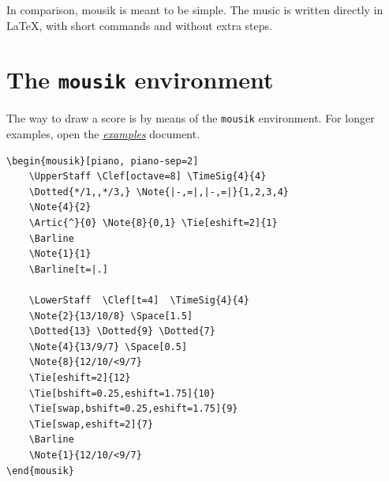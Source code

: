\documentclass[final]{article}
\begin{document}
    In comparison, \textsf{mousik} is meant to be simple. The music is written directly in \LaTeX{}, with short commands and without extra steps.

    \section{The \texttt{mousik} environment}
	The way to draw a score is by means of the \texttt{mousik} environment. For longer examples, open the \href{run:examples.pdf}{\textit{examples}} document.
	
	\begin{center}
\begin{mousik}[piano, piano-sep=2]
	\UpperStaff \Clef[octave=8] 
	 
	  
	\Barline
	\Barline[t=|.]

	\LowerStaff	 \Clef[t=4]  
	 \Space[1.5]
	  
	 \Space[0.5]
	\Barline
\end{mousik}
	\end{center}
	
	\begin{lstlisting}[basicstyle=\ttfamily\small]
\begin{mousik}[piano, piano-sep=2]
	\UpperStaff \Clef[octave=8] \TimeSig{4}{4}
	\Dotted{*/1,,*/3,} \Note{|-,=|,|-,=|}{1,2,3,4}
	\Note{4}{2}
	\Artic{^}{0} \Note{8}{0,1} \Tie[eshift=2]{1}
	\Barline
	\Note{1}{1}
	\Barline[t=|.]

	\LowerStaff	 \Clef[t=4]  \TimeSig{4}{4}
	\Note{2}{13/10/8} \Space[1.5]
	\Dotted{13} \Dotted{9} \Dotted{7}
	\Note{4}{13/9/7} \Space[0.5]
	\Note{8}{12/10/<9/7}
	\Tie[eshift=2]{12} 
	\Tie[bshift=0.25,eshift=1.75]{10}
	\Tie[swap,bshift=0.25,eshift=1.75]{9} 
	\Tie[swap,eshift=2]{7}
	\Barline
	\Note{1}{12/10/<9/7}
\end{mousik}
	\end{lstlisting}
\end{document}

